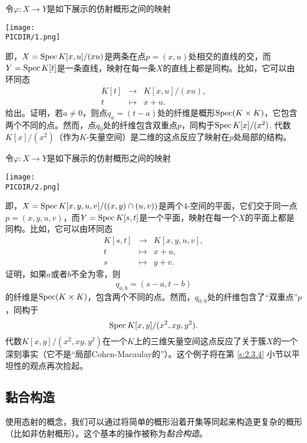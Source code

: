 \begin{exe}\label{exe:1.43}
\begin{compactenum}[(a)]
\item 令$\varphi:X\to Y$是如下展示的仿射概形之间的映射
\begin{center}\texttt{[image: \\PICDIR/1.png]}\end{center}
即，$X=\operatorname{Spec} K[x,u]/(xu)$是两条在点$p=(x,u)$处相交的直线的交，而$Y=\operatorname{Spec} K[t]$是一条直线，映射在每一条$X$的直线上都是同构。比如，它可以由环同态
\[
	\begin{array}{rcl}
	K[t]&\to &K[x,u]/(xu),\\
	t&\mapsto&x+u.
	\end{array}
\]
给出。证明，若$a\neq 0$，则点$q_a=(t-a)$处的纤维是概形$\operatorname{Spec}(K\times K)$，它包含两个不同的点。然而，点$q_0$处的纤维包含双重点$p$，同构于$\operatorname{Spec} K[x]/(x^2)$. 代数$K[x]/(x^2)$（作为$K$-矢量空间）是二维的这点反应了映射在$p$处局部的结构。
\item 令$\varphi:X\to Y$是如下展示的仿射概形之间的映射
\begin{center}\texttt{[image: \\PICDIR/2.png]}\end{center}
即，$X=\operatorname{Spec} K[x,y,u,v]/((x,y)\cap (u,v))$是两个4-空间的平面，它们交于同一点$p=(x,y,u,v)$，而$Y=\operatorname{Spec} K[s,t]$是一个平面，映射在每一个$X$的平面上都是同构。比如，它可以由环同态
\[
	\begin{array}{rcl}
	K[s,t]&\to &K[x,y,u,v],\\
	t&\mapsto&x+u,\\
	s&\mapsto&y+v.
	\end{array}
\]
证明，如果$a$或者$b$不全为零，则
\[
	q_{a,b}=(s-a,t-b)
\]
的纤维是$\operatorname{Spec}(K\times K)$，包含两个不同的点。然而，$q_{0,0}$处的纤维包含了“双重点”$p$，同构于
\[
	\operatorname{Spec} K[x,y]/(x^2,xy,y^2).
\]
代数$K[x,y]/(x^2,xy,y^2)$在一个$K$上的三维矢量空间这点反应了关于簇$X$的一个深刻事实（它不是“局部Cohen-Macaulay的”）。这个例子将在第 \ref{s:2.3.4} 小节以平坦性的观点再次捡起。
\end{compactenum}
\end{exe}

\subsection{黏合构造} \label{s:1.2.4}

使用态射的概念，我们可以通过将简单的概形沿着开集等同起来构造更复杂的概形（比如非仿射概形）。这个基本的操作被称为\textit{黏合构造}。

